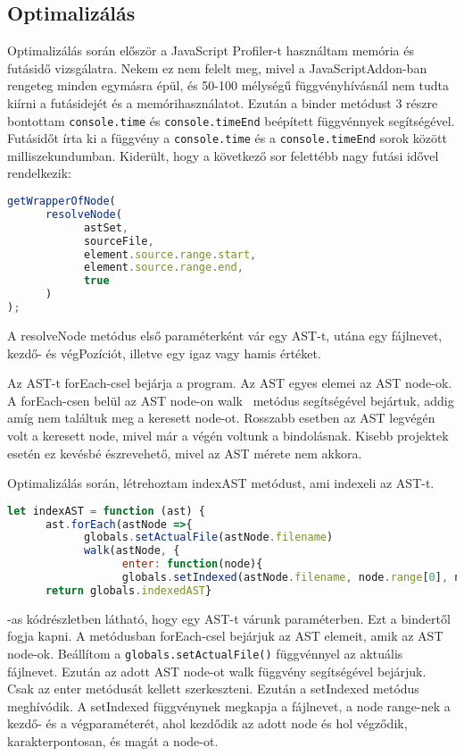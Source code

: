 \subsection{Optimalizálás}
Optimalizálás során először a JavaScript Profiler-t használtam memória és futásidő vizsgálatra.
Nekem ez nem felelt meg, mivel a JavaScriptAddon-ban rengeteg minden egymásra épül, és 50-100 mélységű függvényhívásnál nem tudta kiírni a futásidejét és a memórihasználatot.
Ezután a binder metódust 3 részre bontottam \texttt{console.time} és \texttt{console.timeEnd} beépített függvénnyek segítségével.
Futásidőt írta ki a függvény a \texttt{console.time} és a \texttt{console.timeEnd} sorok között milliszekundumban.
Kiderült, hogy a következő sor felettébb nagy futási idővel rendelkezik:

\begin{lstlisting}[caption={Lassú metódus}, label={lst:binder_problemas_function}, language={JavaScript}]
getWrapperOfNode(
      resolveNode(
            astSet,
            sourceFile,
            element.source.range.start,
            element.source.range.end,
            true
      )
);
\end{lstlisting}

A resolveNode metódus első paraméterként vár egy AST-t, utána egy fájlnevet, kezdő- és végPozíciót, illetve egy igaz vagy hamis értéket.

Az AST-t forEach-csel bejárja a program. Az AST egyes elemei az AST node-ok.
A forEach-csen belül az AST node-on walk~\cite{porter2006abstract}  metódus segítségével bejártuk, addig amíg nem találtuk meg a keresett node-ot.
Rosszabb esetben az AST legvégén volt a keresett node, mivel már a végén voltunk a bindolásnak.
Kisebb projektek esetén ez kevésbé észrevehető, mivel az AST mérete nem akkora.

Optimalizálás során, létrehoztam indexAST metódust, ami indexeli az AST-t.

\begin{lstlisting}[caption={indexAST metódus}, label={lst:indexAST_function}, language={JavaScript}]
let indexAST = function (ast) {
      ast.forEach(astNode =>{
            globals.setActualFile(astNode.filename)
            walk(astNode, {
                  enter: function(node){
                  globals.setIndexed(astNode.filename, node.range[0], node.range[1], node)}})})
      return globals.indexedAST}
\end{lstlisting}

-as kódrészletben látható, hogy egy AST-t várunk paraméterben. Ezt a bindertől fogja kapni.
A metódusban forEach-csel bejárjuk az AST elemeit, amik az AST node-ok.
Beállítom a \texttt{globals.setActualFile()} függvénnyel az aktuális fájlnevet.
Ezután az adott AST node-ot walk függvény segítségével bejárjuk.
Csak az enter metódusát kellett szerkeszteni.
Ezután a setIndexed metódus meghívódik.
A setIndexed függvénynek megkapja a fájlnevet, a node range-nek a kezdő- és a végparaméterét, ahol kezdődik az adott node és hol végződik, karakterpontosan, és magát a node-ot.

